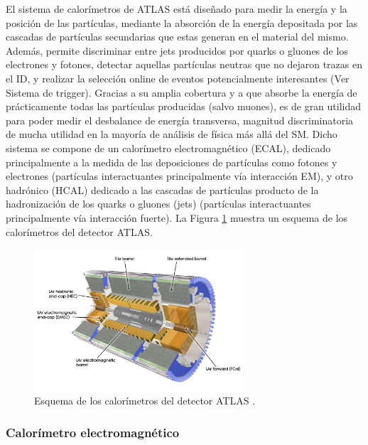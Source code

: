 El sistema de calorímetros de ATLAS está diseñado para medir la energía y la posición de las partículas, mediante la absorción de la energía depositada por las cascadas de partículas secundarias que estas generan en el material del mismo. Además, permite discriminar entre jets producidos por quarks o gluones de los electrones y fotones, detectar aquellas partículas neutras que no dejaron trazas en el ID, y realizar la selección online de eventos potencialmente interesantes (Ver Sistema de trigger). Gracias a su amplia cobertura y a que absorbe la energía de prácticamente todas las partículas producidas (salvo muones), es de gran utilidad para poder medir el desbalance de energía transversa, magnitud discriminatoria de mucha utilidad en la mayoría de análisis de física más allá del SM. Dicho sistema se compone de un calorímetro electromagnético (ECAL), dedicado principalmente a la medida de las deposiciones de partículas como fotones y electrones (partículas interactuantes principalmente vía interacción EM), y otro hadrónico (HCAL) dedicado a las cascadas de partículas producto de la hadronización de los quarks o gluones (jets) (partículas interactuantes principalmente vía interacción fuerte). La Figura \ref{fig:calo_1} muestra un esquema de los calorímetros del detector ATLAS.

\begin{figure}
\centering
  \includegraphics[width=0.7\textwidth]{images/lhc/calo_1.jpg}
  \caption{Esquema de los calorímetros del detector ATLAS \cite{Pequenao:1095927}.}
  \label{fig:calo_1}
\end{figure}

\subsubsection{Calorímetro electromagnético}

